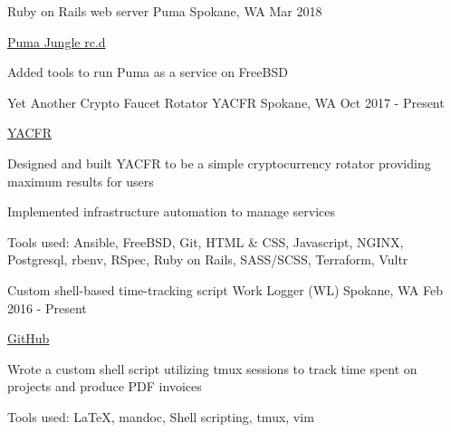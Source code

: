 

\begin{cventries}

  \cventry
    {Ruby on Rails web server} %
    {Puma} %
    {Spokane, WA} %
    {Mar 2018} %
    {
      \begin{cvitems} %
        \item {\href{https://github.com/puma/puma/tree/master/tools/jungle/rc.d}{Puma Jungle rc.d}}
        \item {Added tools to run Puma as a service on FreeBSD}
      \end{cvitems}
    }

  \cventry
    {Yet Another Crypto Faucet Rotator} %
    {YACFR} %
    {Spokane, WA} %
    {Oct 2017 - Present} %
    {
      \begin{cvitems} %
        \item {\href{https://yacfr.com}{YACFR}}
        \item {Designed and built YACFR to be a simple cryptocurrency rotator providing maximum results for users}
        \item {Implemented infrastructure automation to manage services}
        \item {Tools used: Ansible, FreeBSD, Git, HTML \& CSS, Javascript, NGINX, Postgresql, rbenv, RSpec, Ruby on Rails, SASS/SCSS, Terraform, Vultr}
      \end{cvitems}
    }

  \cventry
    {Custom shell-based time-tracking script} %
    {Work Logger (WL)} %
    {Spokane, WA} %
    {Feb 2016 - Present} %
    {
      \begin{cvitems} %
        \item {\href{https://github.com/desnudopenguino/wl}{GitHub}}
        \item {Wrote a custom shell script utilizing tmux sessions to track time spent on projects and produce PDF invoices}
        \item {Tools used: LaTeX, mandoc, Shell scripting, tmux, vim}
      \end{cvitems}
    }


\end{cventries}
